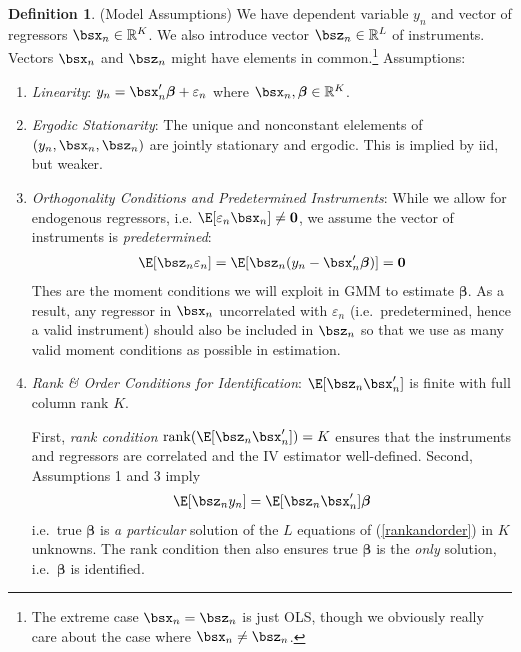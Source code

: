 \documentclass[12pt]{article}
\theoremstyle{plain}
\theoremstyle{definition}
\newtheorem{defn}[thm]{Definition}
\theoremstyle{remark}
\newcommand{\bsbeta}{\boldsymbol{\beta}}
\renewcommand{\bso}{\boldsymbol{0}}
\newcommand{\RK}{\mathbb{R}^K}
\newcommand{\RL}{\mathbb{R}^L}
\newcommand{\rank}{\operatorname{rank}}
\begin{document}
\begin{defn}(Model Assumptions)
We have dependent variable $y_n$ and vector of regressors
$\bsx_n\in\RK$. We also introduce vector $\bsz_n\in\RL$ of
instruments. Vectors $\bsx_n$ and $\bsz_n$ might have elements in
common.\footnote{%
  The extreme case $\bsx_n=\bsz_n$ is just OLS, though we obviously
  really care about the case where $\bsx_n\neq \bsz_n$.
}
Assumptions:
\begin{enumerate}
  \item \emph{Linearity}: $y_n = \bsx_n' \bsbeta + \varepsilon_n$
    where $\bsx_n,\bsbeta\in\RK$.

  \item \emph{Ergodic Stationarity}:
    The unique and nonconstant elelements of $(y_n, \bsx_n, \bsz_n)$ are
    jointly stationary and ergodic. This is implied by iid, but weaker.

  \item
    \emph{Orthogonality Conditions and Predetermined Instruments}:
    While we allow for endogenous regressors, i.e.
    $\E[\varepsilon_n\bsx_n]\neq\bso$, we assume the vector of
    instruments is \emph{predetermined}:
    \begin{align*}
      \E[\bsz_n\varepsilon_n]
      =\E[\bsz_n (y_n - \bsx'_n \bsbeta)]
      = \bso
    \end{align*}
    Thes are the moment conditions we will exploit in GMM to
    estimate $\bsbeta$.
    As a result, any regressor in $\bsx_n$ uncorrelated with
    $\varepsilon_n$ (i.e.\ predetermined, hence a valid instrument)
    should also be included in $\bsz_n$ so that we use as many valid
    moment conditions as possible in estimation.

  \item \emph{Rank \& Order Conditions for Identification}:
    $\E[\bsz_n\bsx_n']$ is finite with full column rank $K$.

    First, \emph{rank condition} $\rank(\E[\bsz_n\bsx_n'])=K$ ensures
    that the instruments and regressors are correlated and the IV
    estimator well-defined. Second, Assumptions 1 and 3 imply
    \begin{align}
      \E[\bsz_n y_n] =
      \E[\bsz_n\bsx'_n] \bsbeta
      \label{rankandorder}
    \end{align}
    i.e.\ true $\bsbeta$ is \emph{a particular} solution of the $L$
    equations of (\ref{rankandorder}) in $K$ unknowns. The rank
    condition then also ensures true $\bsbeta$ is the \emph{only}
    solution, i.e.\ $\bsbeta$ is identified.


\end{enumerate}
\end{defn}
\end{document}
